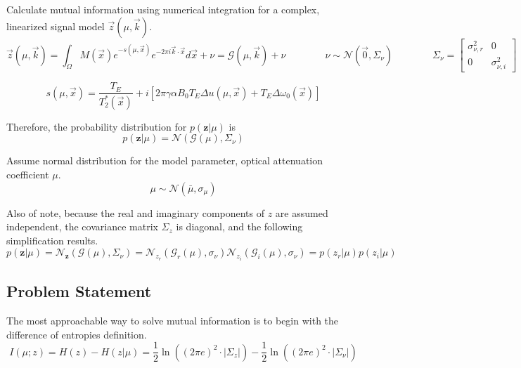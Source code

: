 \documentclass{article}         %
\theoremstyle{definition}
\theoremstyle{remark}
\newcommand{\eq}[1]{\begin{equation} #1 \end{equation}}
\newcommand{\zbf}{\mathbf{z}}
\newcommand{\zcond}{\mathbf{z}|\mu}
\newcommand{\Gscript}{\mathcal{G}}
\newcommand{\Nscript}{\mathcal{N}}
\newcommand{\paren}[1]{\left(#1\right)}
\begin{document}
Calculate mutual information using numerical integration for a complex, linearized signal model $\vec{z}\left(\mu,\vec{k}\right)$.
\begin{equation}
	\vec{z}\left(\mu,\vec{k}\right) = \int_\Omega M\left(\vec{x}\right) e^{-s\left(\mu ,\vec{x}\right)}e^{-2\pi i\vec{k}\cdot\vec{x}}d\vec{x}+\nu=\mathcal{G}\left(\mu,\vec{k}\right)+\nu
	\qquad\qquad \nu\sim\mathcal{N}\left(\vec{0},\Sigma_\nu\right)
	\qquad\qquad \Sigma_\nu = \left[ \begin{array}{cc} 
		\sigma_{\nu,r}^2 & 0 \\
		0 & \sigma_{\nu,i}^2 \end{array} \right]
\end{equation}

\[
	s\left(\mu,\vec{x}\right)=\frac{T_E}{T_2^*\left(\vec{x}\right)}+i\left[2\pi\gamma\alpha B_0 T_E
	\Delta u\left(\mu,\vec{x}\right)+T_E\Delta\omega_0\left(\vec{x}\right)\right]
\]

Therefore, the probability distribution for $p\paren{\zcond}$ is
\eq{p\paren{\zcond} = \Nscript\paren{\Gscript\paren{\mu},\Sigma_\nu}}

Assume normal distribution for the model parameter, optical attenuation coefficient $\mu$.
\begin{equation}
	\mu\sim\mathcal{N}\left(\bar{\mu},\sigma_\mu\right)
\end{equation}

Also of note, because the real and imaginary components of $z$ are assumed independent, the covariance matrix $\Sigma_z$ is diagonal, and the following simplification results.
\eq{p\paren{\zcond} = \Nscript_\zbf\paren{\Gscript\paren{\mu},\Sigma_\nu} = \Nscript_{z_r}\paren{\Gscript_r\paren{\mu},\sigma_\nu}
\Nscript_{z_i}\paren{\Gscript_i\paren{\mu},\sigma_\nu} = p\paren{z_r|\mu}p\paren{z_i|\mu}}

\subsection{Problem Statement}\label{Problem Statement}

The most approachable way to solve mutual information is to begin with the difference of entropies definition.
\begin{equation}
	I\left(\mu;z\right) = H\left(z\right) - H\left(z|\mu\right) 
	= \frac{1}{2}\ln\left(\left(2\pi e\right)^2\cdot\lvert\Sigma_z\rvert\right) - \frac{1}{2}\ln\left(\left(2\pi e\right)^2\cdot\lvert\Sigma_\nu\rvert\right)
\end{equation}
\end{document}

